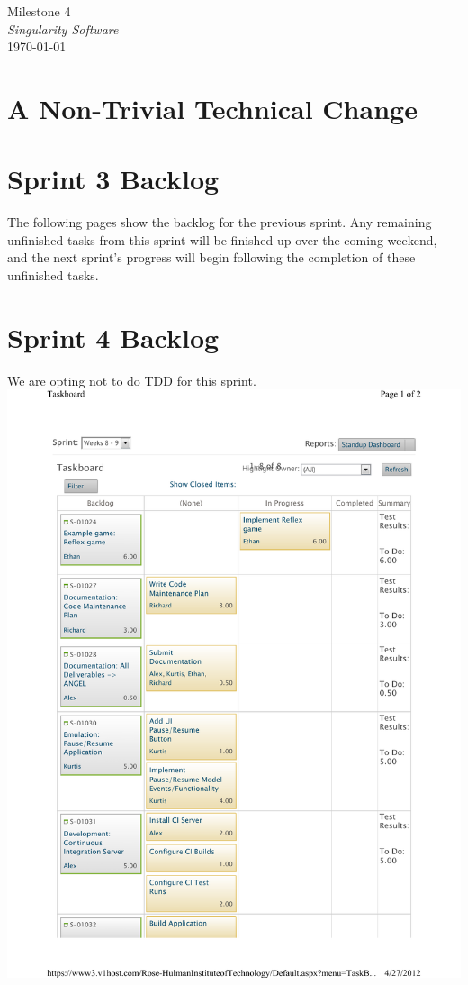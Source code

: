 \documentclass[12pt]{article}
\begin{document}
\begin{center}
	\LARGE{Milestone 4} \\
	\Large{\textit{Singularity Software}} \\
	\vspace{.05in}
	\normalsize{\today} \\
\end{center}

\section*{A Non-Trivial Technical Change}

\section*{Sprint 3 Backlog}
The following pages show the backlog for the previous sprint. Any remaining unfinished tasks from this sprint will be finished up over the coming weekend, and the next sprint's progress will begin following the completion of these unfinished tasks.



\section*{Sprint 4 Backlog}
We are opting not to do TDD for this sprint.
\includegraphics[scale=.85]{pdfs/MS4VersionOne/NewSprintDetail.pdf}

\clearpage

        
\end{document}
